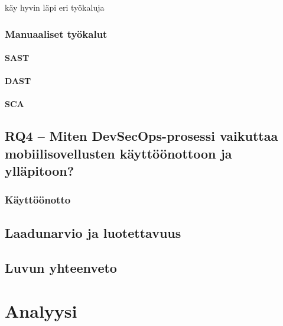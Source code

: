 \documentclass[bscthesis,finnish,oneside,biblatex]{uefcsthesis}
\begin{document}
\cite{feio2024_empirical} käy hyvin läpi eri työkaluja

\subsection{Manuaaliset työkalut}

\subsubsection{SAST}

\subsubsection{DAST}

\subsubsection{SCA}

\section{RQ4 – Miten DevSecOps-prosessi vaikuttaa mobiilisovellusten käyttöönottoon ja ylläpitoon?}
\label{sec:rq4}


\subsection{Käyttöönotto}

\section{Laadunarvio ja luotettavuus}

\section{Luvun yhteenveto}

\chapter{Analyysi}
\label{cha:analyysi}
\end{document}
